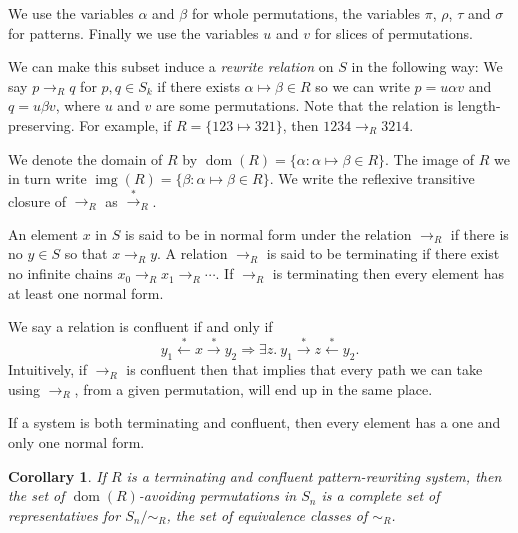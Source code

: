 \documentclass[openany, a4paper, 11pt, english]{article}
\newcommand{\breath}{\vspace{6pt plus 2pt minus 1pt}\noindent}
\newcommand{\patternrule}{ \mapsto \!}
\newtheorem{corollary}[theorem]{Corollary}
\theoremstyle{definition}
\newcommand{\Sym}{S}
\newcommand{\from}{\leftarrow}
\newcommand{\tostar}{\stackrel{*}{\to}}
\newcommand{\fromstar}{\stackrel{*}{\from}}
\DeclareMathOperator{\dom}{dom}
\DeclareMathOperator{\img}{img}
\begin{document}
We use the variables $\alpha$ and $\beta$ for whole permutations, 
the variables $\pi$, $\rho$, $\tau$ and $\sigma$ for patterns.
Finally we use the variables $u$ and $v$ for slices of permutations.

We can make this subset induce a \emph{rewrite relation} on $\Sym$ in the following way: We say
$p \to_R q$ for $p, q \in \Sym_k$ if there exists $\alpha \patternrule \beta \in R$ so
we can write $p = u \alpha v$ and $q = u \beta v$, where
$u$ and $v$ are some permutations.  Note that the relation is
length-preserving. For example, if $R = \{123 \patternrule 321\}$, then $1234 \to_R 3214$. 

\breath We denote the domain of $R$ by $\dom(R) = \{\alpha : \alpha \patternrule
\beta \in R\}$. The image of $R$ we in turn write $\img(R) = \{\beta : \alpha
\patternrule \beta \in R\}$. We write the reflexive transitive closure of
$\to_R$ as $\tostar_R$. 

An element $x$ in $\Sym$ is said to be in normal form under the relation $\to_R$
if there is no $y \in \Sym$ so that $x \to_R y$. A relation $\to_R$ is said to be
terminating if there exist no infinite chains $x_0 \to_R x_1 \to_R \cdots$. If
$\to_R$ is terminating then every element has at least one normal form. 

We say a relation is confluent if and only if
$$
    y_1 \fromstar x \tostar y_2 \Longrightarrow 
    \exists z. \  y_1 \tostar z \fromstar y_2.
$$
Intuitively, if $\to_R$ is confluent then that implies that every path we can
take using $\to_R$, from a given permutation, will end up in the same place. 

If a system is both terminating and confluent, then every element has a one and
only one normal form.

\begin{corollary}
    If $R$ is a terminating and confluent pattern-rewriting system, then the set
    of $\dom(R)$-avoiding permutations in $S_n$ is a complete set of
    representatives for $S_n / \sim_R$, the set of equivalence classes of
    $\sim_R$.
\end{corollary}
\end{document}

